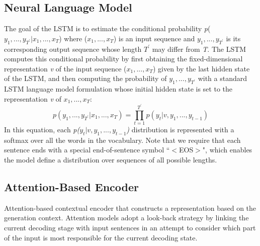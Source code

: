 \documentclass[letterpaper]{article}
\begin{document}
\subsection{Neural Language Model}
The goal of the LSTM is to estimate the conditional probability \textit{p}(\textit{$y_{1},...,y_{T^{'}}|x_{1},...,x_{T}$}) where (\textit{$x_{1},...,x_{T}$}) is an input sequence and \textit{$y_{1},...,y_{T^{'}}$} is its corresponding output sequence whose length \textit{$T^{'}$} may differ from \textit{T}. The LSTM computes this conditional probability by first obtaining the fixed-dimensional representation \textit{v} of the input sequence (\textit{$x_{1},...,x_{T}$}) given by the last hidden state of the LSTM, and then computing the probability of \textit{$y_{1},...,y_{T^{'}}$} with a standard LSTM language model formulation whose initial hidden state is set to the representation \textit{v} of \textit{$x_{1},...,x_{T}$}:
\begin{equation}\label{nlm}
p(y_{1},...,y_{T^{'}}|x_{1},...,x_{T})=\prod_{t=1}^{T^{'}}p(y_{t}|v,y_{1},...,y_{t-1})
\end{equation}
In this equation, each \textit{p($y_{t}|v,y_{1},...,y_{t-1}$)} distribution is represented with a softmax over all the words in the vocabulary. Note that we require that each sentence ends with a special end-of-sentence symbol ``$<$EOS$>$", which enables the model define a distribution over sequences of all possible lengths.

\subsection{Attention-Based Encoder }
Attention-based contextual encoder that constructs a representation based on the generation context. Attention models adopt a look-back strategy by linking the current decoding stage with input sentences in an attempt to consider which part of the input is most responsible for the current decoding state. 
\end{document}
